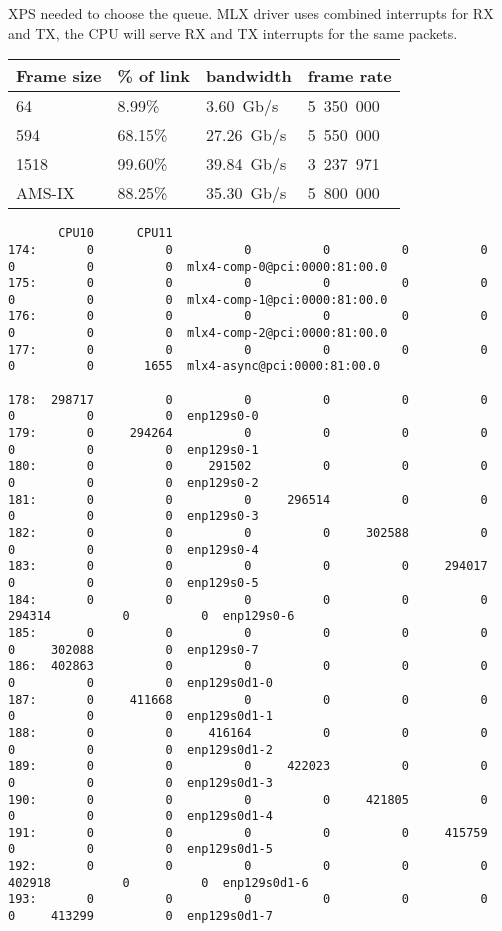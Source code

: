 XPS needed to choose the queue.
MLX driver uses combined interrupts for RX and TX,
the CPU will serve RX and TX interrupts for the same packets.

\begin{tabular}{ | l | l | l | l |}
\hline
Frame size & \% of link & bandwidth & frame rate \\
\hline
64     &  8.99\% &  3.60~Gb/s & 5~350~000 \\
594    & 68.15\% & 27.26~Gb/s & 5~550~000 \\
1518   & 99.60\% & 39.84~Gb/s & 3~237~971 \\
AMS-IX & 88.25\% & 35.30~Gb/s & 5~800~000 \\
\hline
\end{tabular}


\begin{lstlisting}
       CPU10      CPU11
174:       0          0          0          0          0          0          0          0          0  mlx4-comp-0@pci:0000:81:00.0
175:       0          0          0          0          0          0          0          0          0  mlx4-comp-1@pci:0000:81:00.0
176:       0          0          0          0          0          0          0          0          0  mlx4-comp-2@pci:0000:81:00.0
177:       0          0          0          0          0          0          0          0       1655  mlx4-async@pci:0000:81:00.0

178:  298717          0          0          0          0          0          0          0          0  enp129s0-0
179:       0     294264          0          0          0          0          0          0          0  enp129s0-1
180:       0          0     291502          0          0          0          0          0          0  enp129s0-2
181:       0          0          0     296514          0          0          0          0          0  enp129s0-3
182:       0          0          0          0     302588          0          0          0          0  enp129s0-4
183:       0          0          0          0          0     294017          0          0          0  enp129s0-5
184:       0          0          0          0          0          0     294314          0          0  enp129s0-6
185:       0          0          0          0          0          0          0     302088          0  enp129s0-7
186:  402863          0          0          0          0          0          0          0          0  enp129s0d1-0
187:       0     411668          0          0          0          0          0          0          0  enp129s0d1-1
188:       0          0     416164          0          0          0          0          0          0  enp129s0d1-2
189:       0          0          0     422023          0          0          0          0          0  enp129s0d1-3
190:       0          0          0          0     421805          0          0          0          0  enp129s0d1-4
191:       0          0          0          0          0     415759          0          0          0  enp129s0d1-5
192:       0          0          0          0          0          0     402918          0          0  enp129s0d1-6
193:       0          0          0          0          0          0          0     413299          0  enp129s0d1-7
\end{lstlisting}
